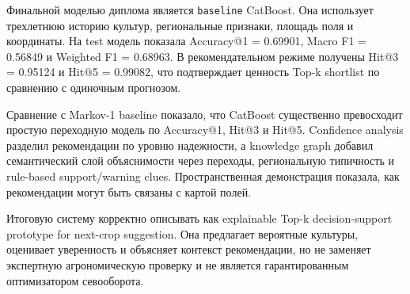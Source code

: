 \documentclass[a4paper,article,14pt]{extarticle}
\begin{document}
Финальной моделью диплома является \texttt{baseline} CatBoost. Она использует трехлетнюю историю культур, региональные признаки, площадь поля и координаты. На test модель показала Accuracy@1 = 0.69901, Macro F1 = 0.56849 и Weighted F1 = 0.68963. В рекомендательном режиме получены Hit@3 = 0.95124 и Hit@5 = 0.99082, что подтверждает ценность Top-k shortlist по сравнению с одиночным прогнозом.

Сравнение с Markov-1 baseline показало, что CatBoost существенно превосходит простую переходную модель по Accuracy@1, Hit@3 и Hit@5. Confidence analysis разделил рекомендации по уровню надежности, а knowledge graph добавил семантический слой объяснимости через переходы, региональную типичность и rule-based support/warning clues. Пространственная демонстрация показала, как рекомендации могут быть связаны с картой полей.

Итоговую систему корректно описывать как explainable Top-k decision-support prototype for next-crop suggestion. Она предлагает вероятные культуры, оценивает уверенность и объясняет контекст рекомендации, но не заменяет экспертную агрономическую проверку и не является гарантированным оптимизатором севооборота.
\end{document}
